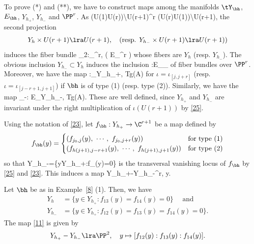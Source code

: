 To prove (*) and (**), we have to construct maps among the manifolds $\tY_\bh$, $E_\bh$, $Y_{h_+}$, $Y_{h_-}$ and $\PP^r$.  
As \beq\label{n25}
 \left(U(1)\times U(r)\right)\backslash U(r+1)\cong \PP^r \cong \left(U(r)\times U(1)\right)\backslash U(r+1),\eeq 
the second projection 
$$Y_h\times U(r+1)\lra U(r+1), \quad (\text{resp. } Y_{h_-}\times U(r+1)\lra U(r+1) )$$ 
induces the fiber bundle  
\beq \label{9} \pr_2:\tY_{\bh}\lra \PP^r, \quad ( E_\bh\lra \PP^r )\eeq
whose fibers are $Y_h$ (resp. $Y_{h_-}$). The obvious inclusion $Y_{h_-}\subset Y_h$ induces the inclusion 
	\beq\label{n19}\jmath:E_\bh\hookrightarrow \tY_\bh\eeq
of fiber bundles over $\PP^r$. 
Moreover, we have the map  
	\beq\label{n20} \pi:\tY_\bh \lra Y_{h_+}, \quad [Tg,A]\mapsto Tg\iota(A)\eeq 
	for $\iota=\iota_{[j,j+r]}$ (resp. $\iota=\iota_{[j-r+1,j+1]}$) if $\bh$ is of type (1) (resp. type (2)). Similarly, we have the map  
	\beq\label{n22} \pi_-: E_\bh\lra Y_{h_-}, \quad [Tg,A]\mapsto Tg\iota(A).\eeq 
	These are well defined, since $Y_{h_+}$ and $Y_{h_-}$ are invariant under the right multiplication of $\iota(U(r+1))$ by \eqref{25}.


Using the notation of \eqref{23}, let $f_\bh:Y_{h_+}\to \C^{r+1}$ be a map defined by 
	\begin{equation*}
		f_\bh(y)=\begin{cases}
			(f_{j_0,j}(y),~\cdots ,~ f_{j_0,j+r}(y)) &\text{for type (1)}\\
			(f_{h(j+1),j-r+1}(y),~\cdots ,~ f_{h(j+1),j+1}(y)) &\text{for type (2)}
		\end{cases}
	\end{equation*}
	so that 
	\beq \label{12} Y_{h_-}=\{y\in Y_{h_+}:f_\bh(y)=0\}\eeq
	is the transversal vanishing locus of $f_\bh$ 
	by \eqref{25} and \eqref{23}. This induces a map 
	\beq  \label{11} Y_{h_+}-Y_{h_-}\lra  \PP^r, \qquad y\mapsto [f_\bh(y)].\eeq
	

\begin{example}
	Let $\bh$ be as in Example~\ref{8} (1). Then, we have 
	\begin{equation*}
		\begin{split}
			Y_{h}&=\{y\in Y_{h_+}:f_{13}(y)=f_{14}(y)=0\} \quad \text{ and}\\
			Y_{h_-}&=\{y\in Y_{h_+}:f_{12}(y)=f_{13}(y)=f_{14}(y)=0\}.
		\end{split}
	\end{equation*}
	The map \eqref{11} is given by
	\[Y_{h_+}-Y_{h_-}\lra \PP^{2}, \quad y\mapsto [f_{12}(y):f_{13}(y):f_{14}(y)].\]
	\end{example}


